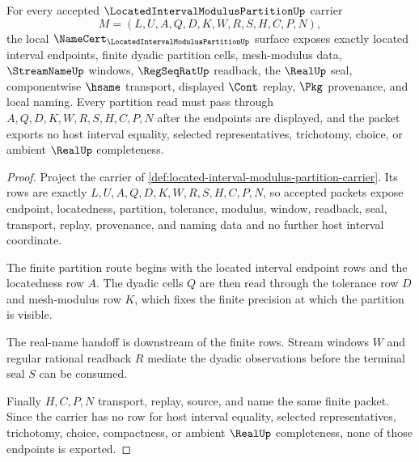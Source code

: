 \begin{theorem}
\label{thm:located-interval-modulus-partition-carrier}
For every accepted $\LocatedIntervalModulusPartitionUp$ carrier
$$
M=(L,U,A,Q,D,K,W,R,S,H,C,P,N),
$$
the local $\NameCert_{\LocatedIntervalModulusPartitionUp}$ surface exposes exactly located interval endpoints, finite dyadic partition cells, mesh-modulus data, $\StreamNameUp$ windows, $\RegSeqRatUp$ readback, the $\RealUp$ seal, componentwise $\hsame$ transport, displayed $\Cont$ replay, $\Pkg$ provenance, and local naming. Every partition read must pass through $A,Q,D,K,W,R,S,H,C,P,N$ after the endpoints are displayed, and the packet exports no host interval equality, selected representatives, trichotomy, choice, or ambient $\RealUp$ completeness.
\end{theorem}
\begin{proof}
Project the carrier of \autoref{def:located-interval-modulus-partition-carrier}. Its rows are exactly $L,U,A,Q,D,K,W,R,S,H,C,P,N$, so accepted packets expose endpoint, locatedness, partition, tolerance, modulus, window, readback, seal, transport, replay, provenance, and naming data and no further host interval coordinate.

The finite partition route begins with the located interval endpoint rows and the locatedness row $A$. The dyadic cells $Q$ are then read through the tolerance row $D$ and mesh-modulus row $K$, which fixes the finite precision at which the partition is visible.

The real-name handoff is downstream of the finite rows. Stream windows $W$ and regular rational readback $R$ mediate the dyadic observations before the terminal seal $S$ can be consumed.

Finally $H,C,P,N$ transport, replay, source, and name the same finite packet. Since the carrier has no row for host interval equality, selected representatives, trichotomy, choice, compactness, or ambient $\RealUp$ completeness, none of those endpoints is exported.
\end{proof}



